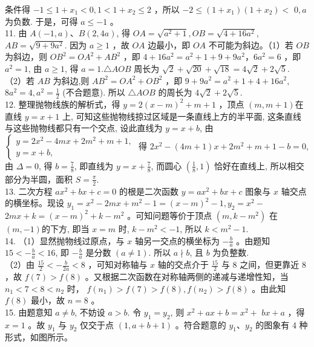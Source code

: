 \documentclass[10pt]{article}
\begin{document}
条件得 $-1 \leqslant 1+x_{1}<0,1<1+x_{2} \leqslant 2$ ，所以 $-2 \leqslant\left(1+x_{1}\right)\left(1+x_{2}\right)<$ $0, a$ 为负数. 于是，可得 $a \leqslant-1$ 。\\
11. 由 $A(-1, a) 、 B(2,4 a)$, 得 $O A=\sqrt{a^{2}+1}, O B=\sqrt{4+16 a^{2}}$, $A B=\sqrt{9+9 a^{2}}$. 因为 $a \geqslant 1$ ，故 $O A$ 边最小，即 $O A$ 不可能为斜边。（1）若 $O B$为斜边，则 $O B^{2}=O A^{2}+A B^{2}$ ，即 $4+16 a^{2}=a^{2}+1+9+9 a^{2} ， 6 a^{2}=6$ ，即 $a^{2}=1$, 由 $a \geqslant 1$, 得 $a=1 . \triangle A O B$ 周长为 $\sqrt{2}+\sqrt{20}+\sqrt{18}=4 \sqrt{2}+2 \sqrt{5}$.\\
（2）若 $A B$ 为斜边,则 $A B^{2}=O A^{2}+O B^{2}$ ，即 $9+9 a^{2}=a^{2}+1+4+16 a^{2}$, $8 a^{2}=4, a^{2}=\frac{1}{2}$ (不合题意). 所以 $\triangle A O B$ 的周长为 $4 \sqrt{2}+2 \sqrt{5}$.\\
12. 整理抛物线族的解析式，得 $y=2(x-m)^{2}+m+1$ ，顶点 $(m, m+1)$在直线 $y=x+1$ 上, 可知这些抛物线掠过区域是一条直线上方的半平面, 这条直线与这些抛物线都只有一个交点, 设此直线为 $y=x+b$, 由 $\left\{\begin{array}{l}y=2 x^{2}-4 m x+2 m^{2}+m+1, \\ y=x+b,\end{array}\right.$ 得 $2 x^{2}-(4 m+1) x+2 m^{2}+m+1-b=0$,由 $\Delta=0$, 得 $b=\frac{7}{8}$, 即直线为 $y=x+\frac{7}{8}$, 而圆心 $\left(\frac{1}{8}, 1\right)$ 恰好在直线上, 所以相交部分为半圆，面积 $S=\frac{\pi}{2}$.\\
13. 二次方程 $a x^{2}+b x+c=0$ 的根是二次函数 $y=a x^{2}+b x+c$ 图象与 $x$ 轴交点的横坐标。现设 $y_{1}=x^{2}-2 m x+m^{2}-1=(x-m)^{2}-1, y_{2}=x^{2}-$ $2 m x+k=(x-m)^{2}+k-m^{2}$ 。可知问题等价于顶点 $\left(m, k-m^{2}\right)$ 在 $(m,-1)$的下方, 即当 $x=m$ 时, $k-m^{2}<-1$, 所以 $k<m^{2}-1$.\\
14. （1）显然抛物线过原点，与 $x$ 轴另一交点的横坐标为 $-\frac{b}{a}$ 。由题知 $15<-\frac{b}{a}<16$, 即 $-\frac{b}{a}$ 是分数 $(a \neq 1)$. 所以 $a \nmid b$, 且 $b$ 为负整数.\\
（2）由 $\frac{15}{2}<-\frac{b}{2 a}<8$ ，可知对称轴与 $x$ 轴的交点介于 $\frac{15}{2}$ 与 8 之间，但更靠近 8 ，故 $f(7)>f(8)$ 。又根据二次函数在对称轴两侧的递减与递增性知，当 $n_{1}<7<8<n_{2}$ 时， $f\left(n_{1}\right)>f(7)>f(8), f\left(n_{2}\right)>f(8)$ 。由此知 $f(8)$ 最小，故 $n=8$ 。\\
15. 由题意知 $a \neq b$, 不妨设 $a>b$. 令 $y_{1}=y_{2}$, 则 $x^{2}+a x+b=x^{2}+$ $b x+a$ ，得 $x=1$ 。故 $y_{1}$ 与 $y_{2}$ 仅交于点 $(1, a+b+1)$ 。符合题意的 $y_{1} 、 y_{2}$ 的图象有 4 种形式，如图所示。\\
\end{document}
